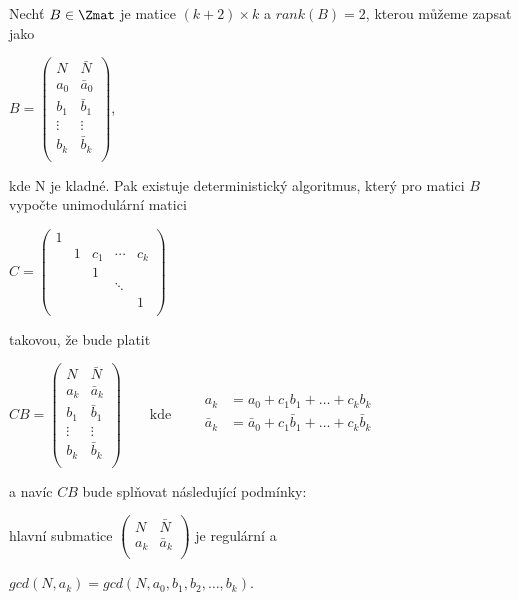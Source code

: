 \begin{vet} \label{gcd_red}
    Nechť $ B \in \Zmat $ je matice $ (k+2) \times k $ a $ rank(B) = 2 $, kterou
    můžeme zapsat jako
\begin{center}
$ B =
    \begin{pmatrix}
        N & \bar{N} \\
        a_0 & \bar{a}_0  \\
        b_1 & \bar{b}_1  \\
        \vdots & \vdots  \\
        b_k & \bar{b}_k  \\
    \end{pmatrix}
$,
\end{center}
kde N je kladné.
Pak existuje deterministický algoritmus, který pro matici $ B $ vypočte unimodulární
matici
\begin{center}
$ C =
    \begin{pmatrix}
        1 &    &     &        &     \\
          & 1  & c_1 & \cdots & c_k \\
          &    & 1   &        &     \\
          &    &     & \ddots &     \\
          &    &     &        & 1   \\
    \end{pmatrix}
$
\end{center}
takovou, že bude platit
\begin{center}
$ CB =
    \begin{pmatrix}
        N & \bar{N} \\
        a_k & \bar{a}_k  \\
        b_1 & \bar{b}_1  \\
        \vdots & \vdots  \\
        b_k & \bar{b}_k  \\
    \end{pmatrix}
\qquad \text{kde} \qquad
\begin{matrix}
    a_k &= a_0 + c_1 b_1 + \dots + c_k b_k \\
    \bar{a}_k &= \bar{a}_0 + c_1 \bar{b}_1 + \dots + c_k \bar{b}_k \\
\end{matrix}
$
\end{center}
a navíc $ CB $ bude splňovat následující podmínky:
\begin{Cond}
    \item hlavní submatice
    $
        \begin{pmatrix}
            N & \bar{N} \\
            a_k & \bar{a}_k  \\
        \end{pmatrix}
    $ je regulární a
    \item $ gcd(N, a_k) = gcd(N, a_0, b_1, b_2, \dots, b_k) $.
\end{Cond}
\end{vet}

